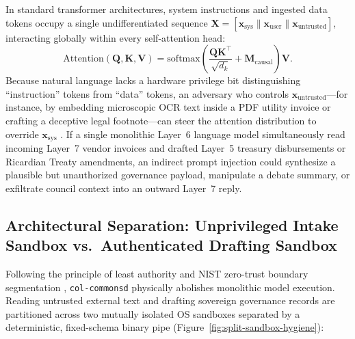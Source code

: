 In standard transformer architectures, system instructions and ingested data tokens occupy a single undifferentiated sequence $\mathbf{X} = [\mathbf{x}_{\mathrm{sys}} \parallel \mathbf{x}_{\mathrm{user}} \parallel \mathbf{x}_{\mathrm{untrusted}}]$, interacting globally within every self-attention head:
\begin{equation}
\mathrm{Attention}(\mathbf{Q}, \mathbf{K}, \mathbf{V}) = \mathrm{softmax}\!\left(\frac{\mathbf{Q}\mathbf{K}^\top}{\sqrt{d_k}} + \mathbf{M}_{\mathrm{causal}}\right)\mathbf{V}.
\label{eq:self-attention-mixing}
\end{equation}
Because natural language lacks a hardware privilege bit distinguishing ``instruction'' tokens from ``data'' tokens, an adversary who controls $\mathbf{x}_{\mathrm{untrusted}}$---for instance, by embedding microscopic OCR text inside a PDF utility invoice or crafting a deceptive legal footnote---can steer the attention distribution to override $\mathbf{x}_{\mathrm{sys}}$ \parencite{greshake2023injection,owasp2023llm}. If a single monolithic Layer~6 language model simultaneously read incoming Layer~7 vendor invoices and drafted Layer~5 treasury disbursements or Ricardian Treaty amendments, an indirect prompt injection could synthesize a plausible but unauthorized governance payload, manipulate a debate summary, or exfiltrate council context into an outward Layer~7 reply.

\subsection{Architectural Separation: Unprivileged Intake Sandbox vs.\ Authenticated Drafting Sandbox}
\label{subsec:intake-vs-drafting-sandboxes}

Following the principle of least authority \parencite{miller2006robust,saltzer1984end} and NIST zero-trust boundary segmentation \parencite{rose2020zero}, \texttt{col-commonsd} physically abolishes monolithic model execution. Reading untrusted external text and drafting sovereign governance records are partitioned across two mutually isolated OS sandboxes separated by a deterministic, fixed-schema binary pipe (Figure~\ref{fig:split-sandbox-hygiene}):

